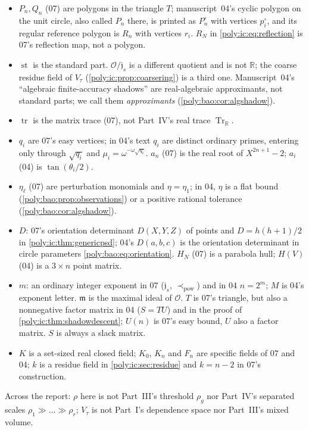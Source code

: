 \documentclass[11pt,a4paper]{article}
\numberwithin{equation}{section}
\theoremstyle{plain}
\newcommand{\R}{\mathbb R}
\newcommand{\st}{\operatorname{st}}
\newcommand{\Tr}{\operatorname{Tr}_{\R}}%
\newcommand{\OO}{\mathcal O}
\newcommand{\mm}{\mathfrak m}
\newcommand{\JJ}{\mathfrak j}
\newcommand{\tr}{\operatorname{tr}}%
\newcommand{\powprec}{\mathrel{\prec_{\mathrm{pow}}}}
\begin{document}
\begin{itemize}
\item $P_n,Q_n$ (07) are polygons in the triangle $T$; manuscript~04's
cyclic polygon on the unit circle, also called $P_n$ there, is printed as
$P^\circ_n$ with vertices $p^\circ_i$, and its regular reference polygon is
$R_n$ with vertices $r_i$. $R_N$ in \eqref{poly:ic:eq:reflection} is 07's
reflection map, not a polygon.
\item $\st$ is the standard part. $\OO/\JJ_s$ is a different quotient and
is not $\R$; the coarse residue field of $V_\tau$ (\cref{poly:ic:prop:coarsering})
is a third one. Manuscript~04's ``algebraic finite-accuracy shadows'' are
real-algebraic approximants, not standard parts; we call them
\emph{approximants} (\cref{poly:bao:cor:algshadow}).
\item $\tr$ is the matrix trace (07), not Part~IV's real trace $\Tr$.
\item $q_i$ are 07's easy vertices; in 04's text $q_i$ are distinct ordinary
primes, entering only through $\sqrt{q_i}$ and $\mu_i=\omega^{-\omega\sqrt{q_i}}$.
$a_n$ (07) is the real root of $X^{2n+1}-2$; $a_i$ (04) is $\tan(\theta_i/2)$.
\item $\eta_\ell$ (07) are perturbation monomials and $\eta=\eta_1$; in 04,
$\eta$ is a flat bound (\cref{poly:bao:prop:observations}) or a positive
rational tolerance (\cref{poly:bao:cor:algshadow}).
\item $D$: 07's orientation determinant $D(X,Y,Z)$ of points and
$D=h(h+1)/2$ in \cref{poly:ic:thm:genericpsd}; 04's $D(a,b,c)$ is the
orientation determinant in circle parameters \eqref{poly:bao:eq:orientation}.
$H_N$ (07) is a parabola hull; $H(V)$ (04) is a $3\times n$ point matrix.
\item $m$: an ordinary integer exponent in 07 ($\JJ_s$, $\powprec$) and in
04 $n=2^m$; $M$ is 04's exponent letter. $\mm$ is the maximal ideal of
$\OO$. $T$ is 07's triangle, but also a nonnegative factor matrix in 04
($S=TU$) and in the proof of \cref{poly:ic:thm:shadowdescent}; $U(n)$ is
07's easy bound, $U$ also a factor matrix. $S$ is always a slack matrix.
\item $K$ is a set-sized real closed field; $K_0$, $K_n$ and $F_n$ are
specific fields of 07 and 04; $k$ is a residue field in
\cref{poly:ic:sec:residue} and $k=n-2$ in 07's construction.
\end{itemize}
Across the report: $\rho$ here is not Part~III's threshold $\rho_g$ nor
Part~IV's separated scales $\rho_1\gg\dots\gg\rho_r$; $V_\tau$ is not Part~I's
dependence space nor Part~III's mixed volume.
\end{document}
